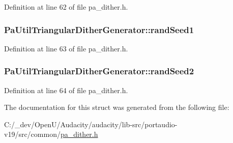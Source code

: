 Definition at line 62 of file pa\+\_\+dither.\+h.

\subsubsection[{\texorpdfstring{rand\+Seed1}{randSeed1}}]{ Pa\+Util\+Triangular\+Dither\+Generator\+::rand\+Seed1}\hypertarget{struct_pa_util_triangular_dither_generator_a4826e30e892e0cab422fc936bc8d5d08}{}\label{struct_pa_util_triangular_dither_generator_a4826e30e892e0cab422fc936bc8d5d08}


Definition at line 63 of file pa\+\_\+dither.\+h.

\subsubsection[{\texorpdfstring{rand\+Seed2}{randSeed2}}]{ Pa\+Util\+Triangular\+Dither\+Generator\+::rand\+Seed2}\hypertarget{struct_pa_util_triangular_dither_generator_af580b9d65bd8d8494e6b5200f9e535d1}{}\label{struct_pa_util_triangular_dither_generator_af580b9d65bd8d8494e6b5200f9e535d1}


Definition at line 64 of file pa\+\_\+dither.\+h.



The documentation for this struct was generated from the following file\+:\begin{DoxyCompactItemize}
\item 
C\+:/\+\_\+dev/\+Open\+U/\+Audacity/audacity/lib-\/src/portaudio-\/v19/src/common/\hyperlink{pa__dither_8h}{pa\+\_\+dither.\+h}\end{DoxyCompactItemize}
